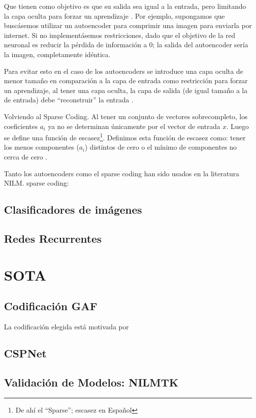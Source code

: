 Que tienen como objetivo es que su salida sea igual a la entrada, pero limitando la capa oculta para forzar un aprendizaje \autocite{stanfordAutoEncoding}.
Por ejemplo, supongamos que buscásemos utilizar un autoencoder para comprimir una imagen para enviarla por internet. Si no implementásemos restricciones, dado que el objetivo de la red neuronal es reducir la pérdida de información a 0; la salida del autoencoder sería la imagen, completamente idéntica.

Para evitar esto en el caso de los autoencoders se introduce una capa oculta de menor tamaño en comparación a la capa de entrada como restricción para forzar un aprendizaje, al tener una capa oculta, la capa de salida (de igual tamaño a la de entrada) debe \enquote{reconstruir} la entrada \autocite{stanfordAutoEncoding} .

Volviendo al Sparse Coding. Al tener un conjunto de vectores sobrecompleto, los coeficientes $a_i$ ya no se determinan únicamente por el vector de entrada $x$. Luego se define una función de escasez\footnote{De ahí el \enquote{Sparse}; escasez en Español}. Definimos esta función de escasez como: tener los menos componentes ($a_i$) distintos de cero o el mínimo de componentes no cerca de cero \autocite{stanfordSparse}.

Tanto los autoencoders como el sparse coding han sido usados en la literatura NILM.
sparse coding:\autocite{SparseCodingNILM}

\subsection{Clasificadores de imágenes}

\subsection{Redes Recurrentes}

\section{SOTA}
\subsection{Codificación GAF} 
La codificación elegida está motivada por  
\subsection{CSPNet}     

\subsection{Validación de Modelos: NILMTK}  
